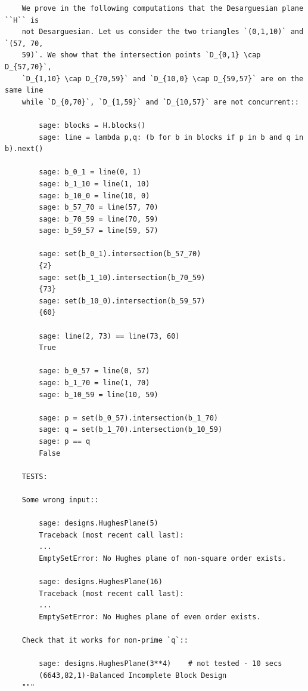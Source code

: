 \documentclass[a4paper]{article}
\begin{document}
\begin{lstlisting}
    We prove in the following computations that the Desarguesian plane ``H`` is
    not Desarguesian. Let us consider the two triangles `(0,1,10)` and `(57, 70,
    59)`. We show that the intersection points `D_{0,1} \cap D_{57,70}`,
    `D_{1,10} \cap D_{70,59}` and `D_{10,0} \cap D_{59,57}` are on the same line
    while `D_{0,70}`, `D_{1,59}` and `D_{10,57}` are not concurrent::

        sage: blocks = H.blocks()
        sage: line = lambda p,q: (b for b in blocks if p in b and q in b).next()

        sage: b_0_1 = line(0, 1)
        sage: b_1_10 = line(1, 10)
        sage: b_10_0 = line(10, 0)
        sage: b_57_70 = line(57, 70)
        sage: b_70_59 = line(70, 59)
        sage: b_59_57 = line(59, 57)

        sage: set(b_0_1).intersection(b_57_70)
        {2}
        sage: set(b_1_10).intersection(b_70_59)
        {73}
        sage: set(b_10_0).intersection(b_59_57)
        {60}

        sage: line(2, 73) == line(73, 60)
        True

        sage: b_0_57 = line(0, 57)
        sage: b_1_70 = line(1, 70)
        sage: b_10_59 = line(10, 59)

        sage: p = set(b_0_57).intersection(b_1_70)
        sage: q = set(b_1_70).intersection(b_10_59)
        sage: p == q
        False

    TESTS:

    Some wrong input::

        sage: designs.HughesPlane(5)
        Traceback (most recent call last):
        ...
        EmptySetError: No Hughes plane of non-square order exists.

        sage: designs.HughesPlane(16)
        Traceback (most recent call last):
        ...
        EmptySetError: No Hughes plane of even order exists.

    Check that it works for non-prime `q`::

        sage: designs.HughesPlane(3**4)    # not tested - 10 secs
        (6643,82,1)-Balanced Incomplete Block Design
    """
\end{lstlisting}       
\thispagestyle{empty}
\newpage
\thispagestyle{empty}
\end{document}
